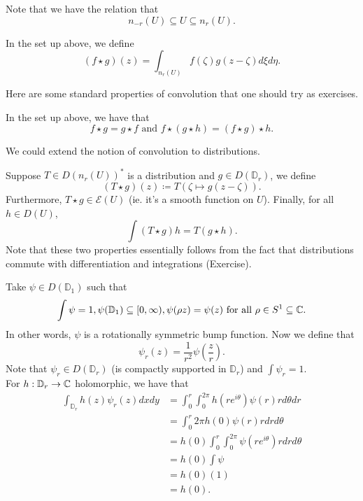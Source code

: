 \documentclass{article}
\begin{document}
{Note that we have the relation that
\[n_{-r}(U) \subseteq U \subseteq n_{r}(U).\]

\begin{definition}
    In the set up above, we define
\[(f \star g)(z) = \int_{n_r(U)} f(\zeta) g(z - \zeta) d\xi d\eta.\]
\end{definition}

Here are some standard properties of convolution that one should try as exercises.
\begin{proposition}
    In the set up above, we have that
    \[f \star g = g \star f \text{ and } f \star (g \star h) = (f \star g) \star h.\]
\end{proposition}

We could extend the notion of convolution to distributions.
\begin{definition}\label{def:conv_dist}
 Suppose $T \in D(n_r(U))^*$ is a distribution and $g \in D(\mathbb{D}_r)$, we define 
 \[(T \star g)(z) \coloneqq T(\zeta \mapsto g(z - \zeta)).\]
 Furthermore, $T \star g \in \mathcal{E}(U)$ (ie. it's a smooth function on $U$). Finally, for all $h \in D(U)$,
 \[\int (T \star g) h = T(g \star h). \]
 Note that these two properties essentially follows from the fact that distributions commute with differentiation and integrations (Exercise).
\end{definition}

Take $\psi \in D(\mathbb{D}_1)$ such that 
\[\int \psi = 1, \psi(\mathbb{D}_1) \subseteq [0, \infty), \psi(\rho z) = \psi(z) \text{ for all } \rho \in S^1 \subseteq \mathbb{C}.\]
In other words, $\psi$ is a rotationally symmetric bump function. Now we define that
\[\psi_{r}(z) = \frac{1}{r^2} \psi(\frac{z}{r}).\]
Note that $\psi_r \in D(\mathbb{D}_r)$ (is compactly supported in $\mathbb{D}_r$) and $\int \psi_r = 1$.\\

For $h: \mathbb{D}_r \to \mathbb{C}$ holomorphic, we have that
\begin{align*}
    \int_{\mathbb{D}_r} h(z) \psi_r(z) dx dy &= \int_0^r \int_0^{2\pi} h(re^{i\theta}) \psi(r) r d\theta dr \tag*{$\psi$ is rotationally symmetric}\\
    &= \int_0^r 2\pi h(0) \psi(r) r dr d\theta \tag*{Mean Value Property} \\
    &= h(0) \int_{0}^r \int_{0}^{2\pi} \psi(r e^{i \theta}) r dr d\theta\\
    &= h(0) \int \psi\\
    &= h(0) (1)\\
    &= h(0).
\end{align*}

}
\end{document}
